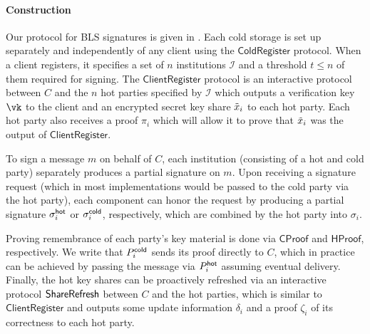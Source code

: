 
\paragraph{Construction}

\newcommand{\corrc}[1]{\textcolor{blue}{#1}}



Our protocol for BLS signatures is given in . Each cold storage is set up separately and independently of any client using the $\mathsf{ColdRegister}$ protocol. When a client registers, it specifies a set of $n$ institutions $\mathcal{I}$ and a threshold $t \leq n$ of them required for signing. The $\mathsf{ClientRegister}$ protocol is an interactive protocol between $C$ and the $n$ hot parties specified by $\mathcal{I}$ which outputs a verification key $\vk$ to the client and an encrypted secret key share $\tilde{x}_i$ to each hot party. Each hot party also receives a proof $\pi_i$ which will allow it to prove that $\tilde{x}_i$ was the output of $\mathsf{ClientRegister}$.

To sign a message $m$ on behalf of $C$, each institution (consisting of a hot and cold party) separately produces a partial signature on $m$. Upon receiving a signature request (which in most implementations would be passed to the cold party via the hot party), each component can honor the request by producing a partial signature $\sigma_i^{\mathsf{hot}}$ or $\sigma_i^{\mathsf{cold}}$, respectively, which are combined by the hot party into $\sigma_i$.

Proving remembrance of each party's key material is done via $\mathsf{CProof}$ and $\mathsf{HProof}$, respectively. We write that $P_i^{\mathsf{cold}}$ sends its proof directly to $C$, which in practice can be achieved by passing the message via $P_i^{\mathsf{hot}}$ assuming eventual delivery.
Finally, the hot key shares can be proactively refreshed via an interactive protocol $\mathsf{ShareRefresh}$ between $C$ and the hot parties, which is similar to $\mathsf{ClientRegister}$ and outputs some update information $\delta_i$ and a proof $\zeta_i$ of its correctness to each hot party.


